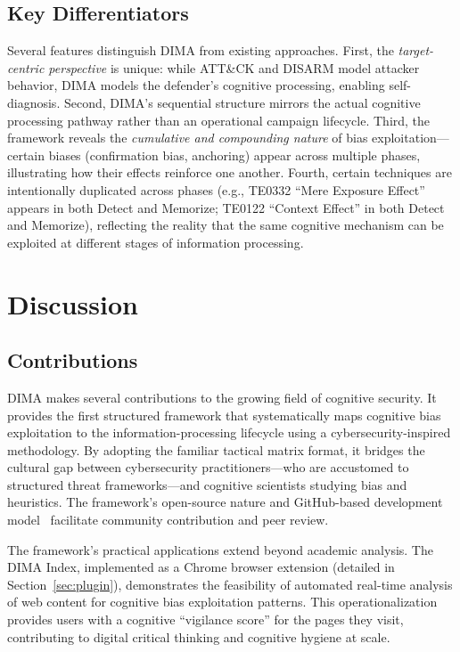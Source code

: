\documentclass[11pt,a4paper]{article}
\begin{document}
\subsection{Key Differentiators}

Several features distinguish DIMA from existing approaches. First, the \textit{target-centric perspective} is unique: while ATT\&CK and DISARM model attacker behavior, DIMA models the defender's cognitive processing, enabling self-diagnosis. Second, DIMA's sequential structure mirrors the actual cognitive processing pathway rather than an operational campaign lifecycle. Third, the framework reveals the \textit{cumulative and compounding nature} of bias exploitation---certain biases (confirmation bias, anchoring) appear across multiple phases, illustrating how their effects reinforce one another. Fourth, certain techniques are intentionally duplicated across phases (e.g., TE0332 ``Mere Exposure Effect'' appears in both Detect and Memorize; TE0122 ``Context Effect'' in both Detect and Memorize), reflecting the reality that the same cognitive mechanism can be exploited at different stages of information processing.

\section{Discussion}
\label{sec:discussion}

\subsection{Contributions}

DIMA makes several contributions to the growing field of cognitive security. It provides the first structured framework that systematically maps cognitive bias exploitation to the information-processing lifecycle using a cybersecurity-inspired methodology. By adopting the familiar tactical matrix format, it bridges the cultural gap between cybersecurity practitioners---who are accustomed to structured threat frameworks---and cognitive scientists studying bias and heuristics. The framework's open-source nature and GitHub-based development model~\cite{boyer2024} facilitate community contribution and peer review.

The framework's practical applications extend beyond academic analysis. The DIMA Index, implemented as a Chrome browser extension (detailed in Section~\ref{sec:plugin}), demonstrates the feasibility of automated real-time analysis of web content for cognitive bias exploitation patterns. This operationalization provides users with a cognitive ``vigilance score'' for the pages they visit, contributing to digital critical thinking and cognitive hygiene at scale.
\end{document}
